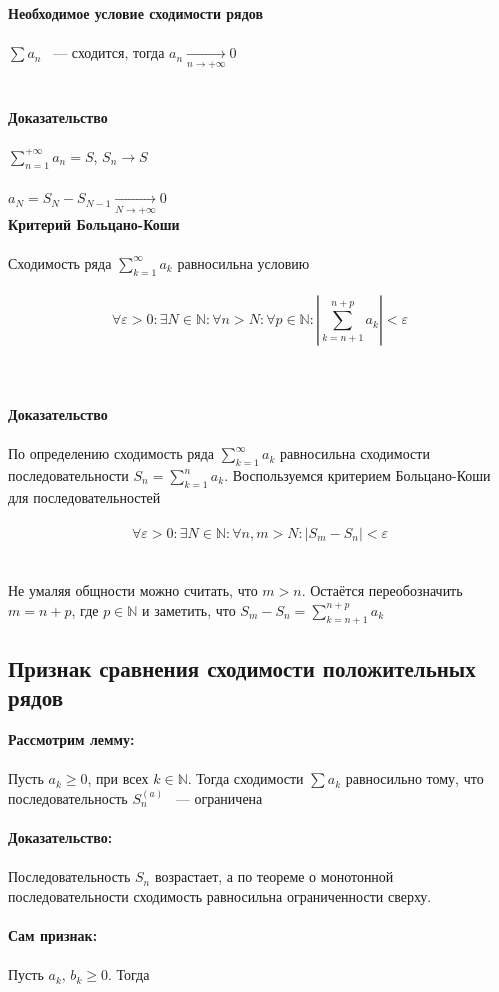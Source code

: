 \documentclass[../main.tex]{subfiles}
\begin{document}
\textbf{Необходимое условие сходимости рядов} \\\\
$\sum a_n$ ~--- сходится, тогда $a_n \xrightarrow[n \rightarrow +\infty]{} 0$\\\\\\
\textbf{Доказательство}\\\\
$\sum\limits^{+\infty}_{n = 1} a_n = S$, $S_n \rightarrow S$\\\\
$a_N = S_N - S_{N - 1} \xrightarrow[N \rightarrow +\infty]{} 0$
\newpage
 \\\textbf{Критерий Больцано-Коши}\\\\
Сходимость ряда $\sum\limits^{\infty}_{k = 1} a_k$ равносильна условию\\\\
$$\forall \varepsilon > 0 : \exists N \in \mathbb{N} : \forall n > N : \forall p \in \mathbb{N} : \left| \sum\limits^{n + p}_{k = n + 1} a_k \right| < \varepsilon$$\\\\\\
\textbf{Доказательство}\\\\
По определению сходимость ряда $\sum\limits^{\infty}_{k = 1} a_k$ равносильна сходимости последовательности $S_n = \sum\limits^n_{k = 1} a_k$. Воспользуемся критерием Больцано-Коши для последовательностей \\\\
$$\forall \varepsilon > 0 : \exists N \in \mathbb{N} : \forall n, m > N : |S_m - S_n| < \varepsilon$$\\\\
Не умаляя общности можно считать, что $m > n$. Остаётся переобозначить $m = n + p$, где $p \in \mathbb{N}$ и заметить, что $S_m - S_n = \sum\limits^{n+p}_{k = n + 1} a_k$
            
\newpage

\subsection{Признак сравнения сходимости положительных рядов}
\textbf{Рассмотрим лемму:} \\\\
Пусть $a_k \geq 0$, при всех $k \in \mathbb{N}$. Тогда сходимости $\sum a_k$ равносильно тому, что последовательность $S_n^{(a)}$ ~--- ограничена \\\\
\textbf{Доказательство:}\\\\
Последовательность ${S_n}$ возрастает, а по теореме о монотонной последовательности сходимость равносильна ограниченности сверху.\\\\
\textbf{Сам признак:} \\\\          
                Пусть $a_k$, $b_k \geq 0$. Тогда
                
\end{document}

